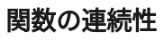 \documentclass[../../math-imaging]{subfiles}
\begin{document}
\section{関数の連続性}

\wip
\end{document}
